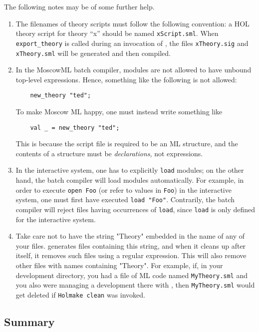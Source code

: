 The following notes may be of some further help.

\begin{enumerate}
\item The filenames of theory scripts must follow the following
  convention: a HOL theory script for theory ``x'' should be named
  \texttt{xScript.sml}.  When \verb+export_theory+ is called during an
  invocation of \holmake, the files \texttt{xTheory.sig} and
  \texttt{xTheory.sml} will be generated and then compiled.

\item In the MoscowML batch compiler, modules are not allowed to have
  unbound top-level expressions. Hence, something like the following
  is not allowed:
\begin{verbatim}
    new_theory "ted";
\end{verbatim}
To make Moscow ML happy, one must instead write something like
\begin{verbatim}
    val _ = new_theory "ted";
\end{verbatim}
\noindent This is because the script file is required to be an ML
structure, and the contents of a structure must be
\emph{declarations}, not expressions.

\item In the interactive system, one has to explicitly \verb+load+
  modules; on the other hand, the batch compiler will load modules
  automatically.  For example, in order to execute \verb+open Foo+ (or
  refer to values in \verb+Foo+) in the interactive system, one must
  first have executed \verb+load "Foo"+. Contrarily, the batch
  compiler will reject files having occurrences of \verb+load+, since
  \verb+load+ is only defined for the interactive system.

\item Take care not to have the string "Theory" embedded in the name
  of any of your files. \holn{} generates files containing this
  string, and when it cleans up after itself, it removes such files
  using a regular expression. This will also remove other files with
  names containing "Theory". For example, if, in your development
  directory, you had a file of ML code named \texttt{MyTheory.sml} and
  you also were managing a \holn{} development there with \holmake,
  then \texttt{MyTheory.sml} would get deleted if {\tt Holmake clean}
  was invoked.

\end{enumerate}

\subsection{Summary}

